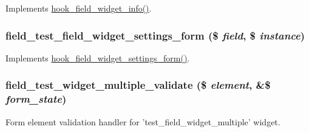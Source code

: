\label{field__test_8field_8inc_aef7269d23d6ee771fbc46a8968aa9ea7}
Implements \hyperlink{group__field__widget_gac53aa6c2a4ac1215660d25b5d7f20792}{hook\_\-field\_\-widget\_\-info()}. \hypertarget{field__test_8field_8inc_a154d213069decb27ac326b793a957530}{
\subsubsection[{field\_\-test\_\-field\_\-widget\_\-settings\_\-form}]{\setlength{\rightskip}{0pt plus 5cm}field\_\-test\_\-field\_\-widget\_\-settings\_\-form (\$ {\em field}, \/  \$ {\em instance})}}
\label{field__test_8field_8inc_a154d213069decb27ac326b793a957530}
Implements \hyperlink{group__field__types_gabe5ece2134d0cbdfc3c4793f24c5866c}{hook\_\-field\_\-widget\_\-settings\_\-form()}. \hypertarget{field__test_8field_8inc_a70d1c2945ba7186118c0ddf76ac27117}{
\subsubsection[{field\_\-test\_\-widget\_\-multiple\_\-validate}]{\setlength{\rightskip}{0pt plus 5cm}field\_\-test\_\-widget\_\-multiple\_\-validate (\$ {\em element}, \/  \&\$ {\em form\_\-state})}}
\label{field__test_8field_8inc_a70d1c2945ba7186118c0ddf76ac27117}
Form element validation handler for 'test\_\-field\_\-widget\_\-multiple' widget. 